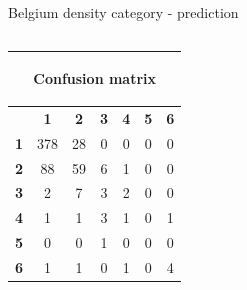 \documentclass[c]{beamer}
\begin{document}
\begin{frame}
\begin{columns}
\begin{column}{0.5\textwidth}
\begin{overlayarea}{\linewidth}{4cm}
  \end{overlayarea}
  \begin{overlayarea}{\linewidth}{0.5cm}
    \centering
    \tiny Belgium density category - prediction\par
  \end{overlayarea}
 \end{column}
\end{columns}
\begin{columns}
 \begin{column}{0.6\textwidth}
 \begin{overlayarea}{\linewidth}{2cm}
  \begin{table}
  \begin{center}
  \begin{adjustbox}{max width=0.6\textwidth}
  {\tiny
  \begin{tabular}{|c|c|c|c|c|c|c|}
    \hline
    \multicolumn{7}{|c|}{{\tiny \begin{bf}Confusion matrix\end{bf}}} \\
    \hline
     & \textbf{1} & \textbf{2} & \textbf{3} & \textbf{4} & \textbf{5} & \textbf{6}\\
    \hline
    \textbf{1} & 378 & 28 & 0 & 0 & 0 & 0\\
    \hline
    \textbf{2} & 88 & 59 & 6 & 1 & 0 & 0\\
    \hline
    \textbf{3} & 2 & 7 & 3 & 2 & 0 & 0\\
    \hline
    \textbf{4} & 1 & 1 & 3 & 1 & 0 & 1\\
    \hline
    \textbf{5} & 0 & 0 & 1 & 0 & 0 & 0\\
    \hline
    \textbf{6} & 1 & 1 & 0 & 1 & 0 & 4\\
    \hline
  \end{tabular}
  }
  \end{adjustbox}
  \end{center}
  \end{table}
 \end{overlayarea}
 \end{column}
 \begin{column}{0.6\textwidth}

\end{column}
\end{columns}
\end{frame}
\end{document}
